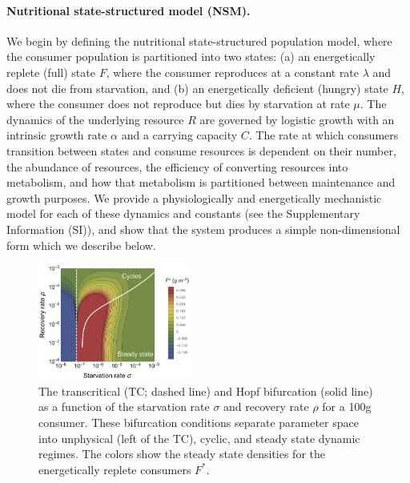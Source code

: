 \documentclass[twocolumn,preprintnumbers,amsmath,amssymb,superscriptaddress]{revtex4}
\begin{document}
\begin{bibunit}[unsrt]
  \noindent \paragraph*{{\bf Nutritional state-structured model (NSM).}}
  We begin by defining the nutritional state-structured population model, where the consumer population is partitioned into two states: (a) an
  energetically replete (full) state $F$, where the consumer reproduces at a
  constant rate $\lambda$ and does not die from starvation, and (b) an
  energetically deficient (hungry) state $H$, where the consumer does not
  reproduce but dies by starvation at rate $\mu$. The dynamics of the
  underlying resource $R$ are governed by logistic growth with an intrinsic
  growth rate $\alpha$ and a carrying capacity $C$. The rate at which consumers
  transition between states and consume resources is dependent on their number,
  the abundance of resources, the efficiency of converting resources into
  metabolism, and how that metabolism is partitioned between maintenance and
  growth purposes.  We provide a physiologically and energetically mechanistic
  model for each of these dynamics and constants (see the Supplementary Information
  (SI)), and show that the system produces a simple non-dimensional form which
  we describe below.

  \begin{figure}
  \centering
  \includegraphics[width=0.45\textwidth]{fig_FixedPoint2-eps-converted-to.pdf}
  \caption{\small{ The transcritical (TC; dashed line) and Hopf bifurcation (solid line) as a
    function of the starvation rate $\sigma$ and recovery rate $\rho$ for a 100g consumer.  These
    bifurcation conditions separate parameter space into unphysical (left of the TC), cyclic,
    and steady state dynamic regimes.  The colors show the steady state densities for the energetically replete consumers $F^*$.  
  }\label{fig:fp}}
  \end{figure}


\end{bibunit}
\end{document}
